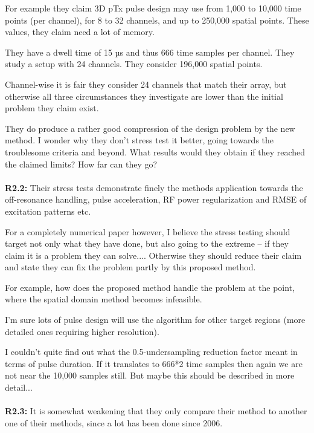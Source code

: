 \documentclass[11pt]{article}
\begin{document}
For example they claim 3D pTx pulse design may use from 1,000 to 10,000 time points (per channel), for 8 to 32 channels, and up to 250,000 spatial points. These values, they claim need a lot of memory.

They have a dwell time of 15 µs and thus 666 time samples per channel.
They study a setup with 24 channels.
They consider 196,000 spatial points.

Channel-wise it is fair they consider 24 channels that match their array, but otherwise all three circumstances they investigate are lower than the initial problem they claim exist.

They do produce a rather good compression of the design problem by the new method. I wonder why they don't stress test it better, going towards the troublesome criteria and beyond. What results would they obtain if they reached the claimed limits? How far can they go?
\\[0.2em]
\indent{\it \textcolor{blue}{Done.}}
\\[1.2em]


{\bf R2.2:} Their stress tests demonstrate finely the methods application towards the off-resonance handling, pulse acceleration, RF power regularization and RMSE of excitation patterns etc.

For a completely numerical paper however, I believe the stress testing should target not only what they have done, but also going to the extreme -- if they claim it is a problem they can solve.... Otherwise they should reduce their claim and state they can fix the problem partly by this proposed method.

For example, how does the proposed method handle the problem at the point, where the spatial domain method becomes infeasible.

I'm sure lots of pulse design will use the algorithm for other target regions (more detailed ones requiring higher resolution).

I couldn't quite find out what the 0.5-undersampling reduction factor meant in terms of pulse duration. If it translates to 666*2 time samples then again we are not near the 10,000 samples still. But maybe this should be described in more detail...
\\[0.2em]
\indent{\it \textcolor{blue}{Done.}}
\\[1.2em]

{\bf R2.3:} It is somewhat weakening that they only compare their method to another one of their methods, since a lot has been done since 2006.
\end{document}
